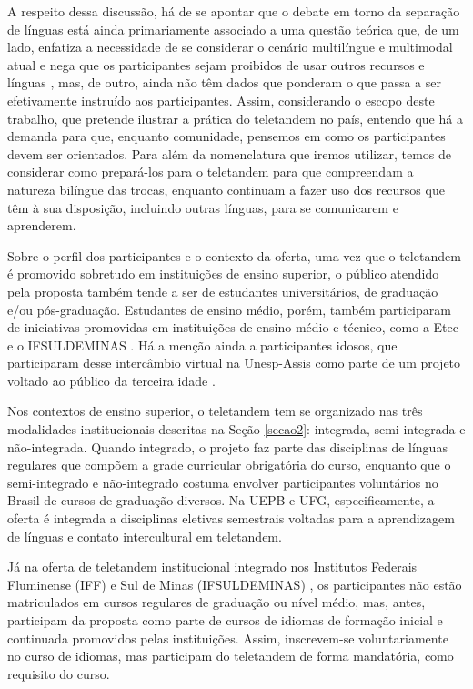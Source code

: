 \documentclass[portuguese]{textolivre}
\begin{document}
A respeito dessa discussão, há de se apontar que o debate em torno da separação de línguas está ainda primariamente associado a uma questão teórica que, de um lado, enfatiza a necessidade de se considerar o cenário multilíngue e multimodal atual e nega que os participantes sejam proibidos de usar outros recursos e línguas \cite{oliveira2024, satar2023}, mas, de outro, ainda não têm dados que ponderam o que passa a ser efetivamente instruído aos participantes. Assim, considerando o escopo deste trabalho, que pretende ilustrar a prática do teletandem no país, entendo que há a demanda para que, enquanto comunidade, pensemos em como os participantes devem ser orientados. Para além da nomenclatura que iremos utilizar, temos de considerar como prepará-los para o teletandem para que compreendam a natureza bilíngue das trocas, enquanto continuam a fazer uso dos recursos que têm à sua disposição, incluindo outras línguas, para se comunicarem e aprenderem.

Sobre o perfil dos participantes e o contexto da oferta, uma vez que o teletandem é promovido sobretudo em instituições de ensino superior, o público atendido pela proposta também tende a ser de estudantes universitários, de graduação e/ou pós-graduação. Estudantes de ensino médio, porém, também participaram de iniciativas promovidas em instituições de ensino médio e técnico, como a Etec \cite{fernandes2023} e o IFSULDEMINAS \cite{reno2024}. Há a menção ainda a participantes idosos, que participaram desse intercâmbio virtual na Unesp-Assis como parte de um projeto voltado ao público da terceira idade \cite{oliveira2022}.

Nos contextos de ensino superior, o teletandem tem se organizado nas três modalidades institucionais descritas na Seção \ref{secao2}: integrada, semi-integrada e não-integrada. Quando integrado, o projeto faz parte das disciplinas de línguas regulares que compõem a grade curricular obrigatória do curso, enquanto que o semi-integrado e não-integrado costuma envolver participantes voluntários no Brasil de cursos de graduação diversos. Na UEPB e UFG, especificamente, a oferta é integrada a disciplinas eletivas semestrais voltadas para a aprendizagem de línguas e contato intercultural em teletandem.

Já na oferta de teletandem institucional integrado nos Institutos Federais Fluminense (IFF) \cite{willima2021} e Sul de Minas (IFSULDEMINAS) \cite{reno2024}, os participantes não estão matriculados em cursos regulares de graduação ou nível médio, mas, antes, participam da proposta como parte de cursos de idiomas de formação inicial e continuada promovidos pelas instituições. Assim, inscrevem-se voluntariamente no curso de idiomas, mas participam do teletandem de forma mandatória, como requisito do curso.
\end{document}
